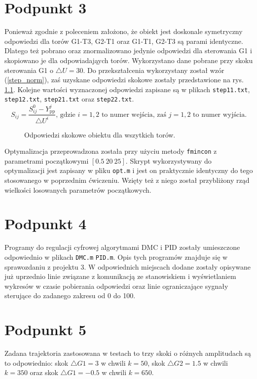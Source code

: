 \chapter{Podpunkt 3}
Ponieważ zgodnie z poleceniem założono, że obiekt jest doskonale symetryczny odpowiedzi dla torów G1-T3, G2-T1 oraz G1-T1, G2-T3 są parami identyczne. Dlatego też pobrano oraz znormalizowano jedynie odpowiedzi dla sterowania G1 i skopiowano je dla odpowiadająych torów. Wykorzystano dane pobrane przy skoku sterowania G1 o $\triangle U = 30$. Do przekształcenia wykorzystany został wzór (\ref{step_norm}), zaś uzyskane odpowiedzi skokowe zostały przedstawione na rys. \ref{Z3}. Kolejne wartości wyznaczonej odpowiedzi zapisane są w plikach \verb+step11.txt+, \verb+step12.txt+, \verb+step21.txt+ oraz \verb+step22.txt+.
\begin{equation}
S_{ij} = \frac{S_{ij}^0 - Y^{j}_{\mathrm{pp}}}{\triangle U^i} \textrm{, gdzie } i=1,2 \textrm{ to numer wejścia, zaś } j=1,2 \textrm{ to numer wyjścia.}
\label{step_norm}
\end{equation}

\begin{figure}[ht]
\centering

\caption{Odpowiedzi skokowe obiektu dla wszytkich torów.}
\label{Z3}
\end{figure}

Optymalizacja przeprowadzona została przy użyciu metody \verb+fmincon+ z parametrami początkowymi $[\num{0,5} ~ 20 ~ 25]$. Skrypt wykorzystywany do optymalizacji jest zapisany w pliku \verb|opt.m| i jest on praktycznie identyczny do tego stosowanego w poprzednim ćwiczeniu. Wzięty też z niego został przybliżony rząd wielkości losowanych parametrów początkowych.

\chapter{Podpunkt 4}
Programy do regulacji cyfrowej algorytmami DMC i PID zostały umieszczone odpowiednio w plikach \verb+DMC.m+ \verb+PID.m+. Opis tych programów znajduje się w sprawozdaniu z projektu 3. W odpowiednich miejscach dodane zostały opisywane już uprzednio linie związane z komunikacją ze stanowiskiem i wyświetlaniem wykresów w czasie pobierania odpowiedzi oraz linie ograniczające sygnały sterujące do zadanego zakresu od 0 do 100.

\chapter{Podpunkt 5}
Zadana trajektoria zastosowana w testach to trzy skoki o różnych amplitudach są to odpowiednio: skok $\triangle G1 = 3$ w chwili $k=50$, skok $\triangle G2 = \num{1.5}$ w chwili $k=350$ oraz skok $\triangle G1 = \num{-0.5}$ w chwili $k=650$.

